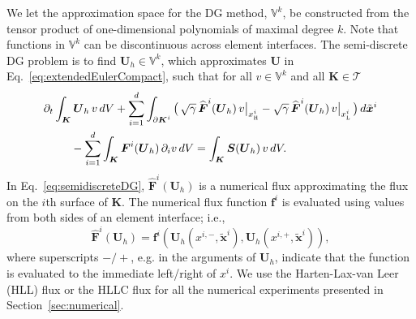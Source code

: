 \documentclass[letterpaper]{jpconf}
\newcommand{\vect}[1]{\boldsymbol{#1}}
\newcommand{\pd}[2]{\partial_{#2}{#1}}
\newcommand{\bx}{\vect{x}}
\newcommand{\bK}{\vect{K}}
\newcommand{\xL}{x_{\textnormal{\tiny\textsc{L}}}}
\newcommand{\xH}{x_{\textnormal{\tiny\textsc{H}}}}
\begin{document}
We let the approximation space for the DG method, $\mathbb{V}^{k}$, be constructed from the tensor product of one-dimensional polynomials of maximal degree $k$.  
Note that functions in $\mathbb{V}^{k}$ can be discontinuous across element interfaces.  
The semi-discrete DG problem is to find $\vect{U}_{h}\in\mathbb{V}^{k}$, which approximates $\vect{U}$ in Eq.~\eqref{eq:extendedEulerCompact}, such that for all $v\in\mathbb{V}^{k}$ and all $\bK\in\mathcal{T}$
\begin{align}
  &\partial_{t}\int_{\bK}\vect{U}_{h}\,v\,dV
  +\sum_{i=1}^{d}\int_{\partial\bK^{i}}\big(\,\sqrt{\gamma}\,\widehat{\vect{F}}^{i}(\vect{U}_{h})\,v\big|_{\xH^{i}}-\sqrt{\gamma}\,\widehat{\vect{F}}^{i}(\vect{U}_{h})\,v\big|_{\xL^{i}}\,\big)\,d\tilde{\bx}^{i} \nonumber \\
  &\hspace{24pt}
  -\sum_{i=1}^{d}\int_{\bK}\vect{F}^{i}(\vect{U}_{h})\,\pd{v}{i}\,dV
  =\int_{\bK}\vect{S}(\vect{U}_{h})\,v\,dV.  
  \label{eq:semidiscreteDG}
\end{align}
In Eq.~\eqref{eq:semidiscreteDG}, $\widehat{\vect{F}}^{i}(\vect{U}_{h})$ is a numerical flux approximating the flux on the $i$th surface of $\bK$.  
The numerical flux function $\vect{f}^{i}$ is evaluated using values from both sides of an element interface; i.e.,
\begin{equation}
  \widehat{\vect{F}}^{i}(\vect{U}_{h})=\vect{f}^{i}(\vect{U}_{h}(x^{i,-},\tilde{\bx}^{i}),\vect{U}_{h}(x^{i,+},\tilde{\bx}^{i})),
\end{equation}
where superscripts $-/+$, e.g. in the arguments of $\vect{U}_{h}$, indicate that the function is evaluated to the immediate left/right of $x^{i}$.  
We use the Harten-Lax-van Leer (HLL) flux \cite{harten_etal_1983} or the HLLC flux \cite{toro_etal_1994,mignoneBodo_2005} for all the numerical experiments presented in Section~\ref{sec:numerical}.  
\end{document}
